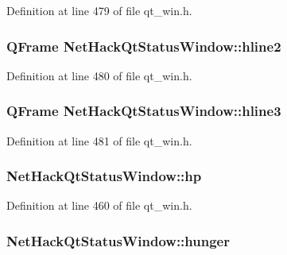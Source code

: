 Definition at line 479 of file qt\+\_\+win.\+h.

\hypertarget{classNetHackQtStatusWindow_a6b3cafcec2bc6d2466410d013b217cbb}{
\subsubsection[{hline2}]{\setlength{\rightskip}{0pt plus 5cm}Q\+Frame Net\+Hack\+Qt\+Status\+Window\+::hline2\hspace{0.3cm}{\ttfamily [private]}}}\label{classNetHackQtStatusWindow_a6b3cafcec2bc6d2466410d013b217cbb}


Definition at line 480 of file qt\+\_\+win.\+h.

\hypertarget{classNetHackQtStatusWindow_a249eb2163546a0a1072ac07871a9b965}{
\subsubsection[{hline3}]{\setlength{\rightskip}{0pt plus 5cm}Q\+Frame Net\+Hack\+Qt\+Status\+Window\+::hline3\hspace{0.3cm}{\ttfamily [private]}}}\label{classNetHackQtStatusWindow_a249eb2163546a0a1072ac07871a9b965}


Definition at line 481 of file qt\+\_\+win.\+h.

\hypertarget{classNetHackQtStatusWindow_a3699022031c755f67d9237b938a72498}{
\subsubsection[{hp}]{ Net\+Hack\+Qt\+Status\+Window\+::hp\hspace{0.3cm}{\ttfamily [private]}}}\label{classNetHackQtStatusWindow_a3699022031c755f67d9237b938a72498}


Definition at line 460 of file qt\+\_\+win.\+h.

\hypertarget{classNetHackQtStatusWindow_ac9d3e36f2daeb99c6c65c71b3542f559}{
\subsubsection[{hunger}]{ Net\+Hack\+Qt\+Status\+Window\+::hunger\hspace{0.3cm}{\ttfamily [private]}}}\label{classNetHackQtStatusWindow_ac9d3e36f2daeb99c6c65c71b3542f559}



